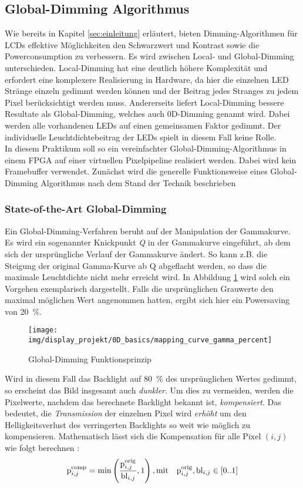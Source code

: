\subsection{Global-Dimming Algorithmus}
\label{subsec:funktion_global_dimming}
Wie bereits in Kapitel \ref{sec:einleitung} erläutert, bieten Dimming-Algorithmen für LCDs effektive Möglichkeiten den Schwarzwert und Kontrast sowie die Powerconsumption zu verbessern. Es wird zwischen Local- und Global-Dimming unterschieden. Local-Dimming hat eine deutlich höhere Komplexität und erfordert eine komplexere Realisierung in Hardware, da hier die einzelnen LED Stränge einzeln gedimmt werden können und der Beitrag jedes Stranges zu jedem Pixel berücksichtigt werden muss. Andererseits liefert Local-Dimming bessere Resultate als Global-Dimming, welches auch 0D-Dimming genannt wird. Dabei werden alle vorhandenen LEDs auf einen gemeinsamen Faktor gedimmt. Der individuelle Leuchtdichtebeitrag der LEDs spielt in diesem Fall keine Rolle.\\
In diesem Praktikum soll so ein vereinfachter Global-Dimming-Algorithmus in einem FPGA auf einer virtuellen Pixelpipeline realisiert werden. Dabei wird kein Framebuffer verwendet. Zunächst wird die generelle Funktionsweise eines Global-Dimming Algorithmus nach dem Stand der Technik beschrieben
\subsubsection{State-of-the-Art Global-Dimming}
\label{subsub:SoA_0D}
Ein Global-Dimming-Verfahren beruht auf der Manipulation der Gammakurve. Es wird ein sogenannter Knickpunkt \emph{Q} in der Gammakurve eingeführt, ab dem sich der ursprüngliche Verlauf der Gammakurve ändert. So kann z.B. die Steigung der original Gamma-Kurve ab Q abgeflacht werden, so dass die maximale Leuchtdichte nicht mehr erreicht wird. In Abbildung \ref{fig:dimming_gamme_curve} wird solch ein Vorgehen exemplarisch dargestellt. Falls die ursprünglichen Grauwerte den maximal möglichen Wert angenommen hatten, ergibt sich hier ein Powersaving von 20\ \%.
\begin{figure}[H]
	\centering
	\texttt{[image: img/display\_projekt/0D\_basics/mapping\_curve\_gamma\_percent]}
	\caption{Global-Dimming Funktionsprinzip \cite{Schmidt_edC16}}
	\label{fig:dimming_gamme_curve}
\end{figure}
Wird in diesem Fall das Backlight auf 80\ \% des ursprünglichen Wertes gedimmt, so erscheint das Bild insgesamt auch \emph{dunkler}. Um dies zu vermeiden, werden die Pixelwerte, nachdem das berechnete Backlight bekannt ist, \emph{kompensiert}. Das bedeutet, die \emph{Transmission} der einzelnen Pixel wird \emph{erhöht} um den Helligkeitsverlust des verringerten Backlights so weit wie möglich zu kompensieren. Mathematisch lässt sich die Kompensation für alle Pixel $ (i,j) $ wie folgt berechnen \cite[p.67]{Albrecht2010}:
\begin{equation}
\mathrm{p}^{\mathrm{comp}}_{i,j} = \mathrm{min}\left(\frac{\mathrm{p}^{\mathrm{orig}}_{i,j}}{\mathrm{bl}_{i,j}},1\right), \\
\mathrm{mit}\quad \mathrm{p}^\mathrm{orig}_{i,j}, \mathrm{bl}_{i,j} \in [0..1]
\label{eq:compensation}
\end{equation}


